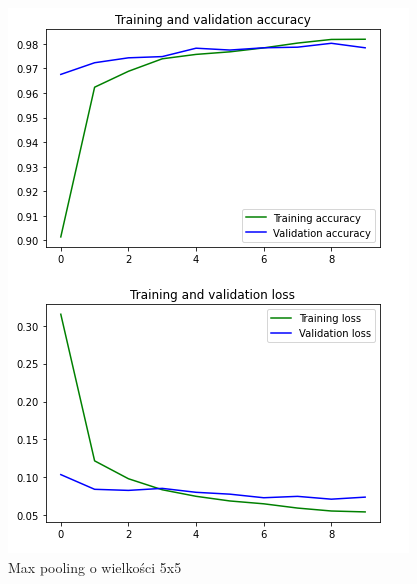 \documentclass{article}
\begin{document}
\begin{figure}[!htb]
  \centering
  \includegraphics[width=\linewidth]{pooling_max_5_5.png}
  \caption{Max pooling o wielkości 5x5}
\end{figure}
\end{document}
